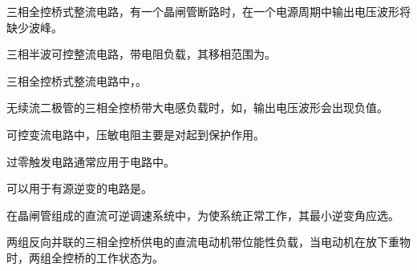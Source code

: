 \documentclass[电力电子]{subfiles}
\begin{document}
\begin{ti}
	三相全控桥式整流电路，有一个晶闸管断路时，在一个电源周期中输出电压波形将缺少波峰。
\end{ti}

\begin{ti}
	三相半波可控整流电路，带电阻负载，其移相范围为。
\end{ti}

\begin{ti}
	三相全控桥式整流电路中，。
\end{ti}

\begin{ti}
	无续流二极管的三相全控桥带大电感负载时，如，输出电压波形会出现负值。
\end{ti}

\begin{ti}
	可控变流电路中，压敏电阻主要是对起到保护作用。
\end{ti}

\begin{ti}
	过零触发电路通常应用于电路中。
\end{ti}

\begin{ti}
	可以用于有源逆变的电路是。
\end{ti}

\begin{ti}
	在晶闸管组成的直流可逆调速系统中，为使系统正常工作，其最小逆变角应选。
\end{ti}

\begin{ti}
	两组反向并联的三相全控桥供电的直流电动机带位能性负载，当电动机在放下重物时，两组全控桥的工作状态为。
\end{ti}
\end{document}
